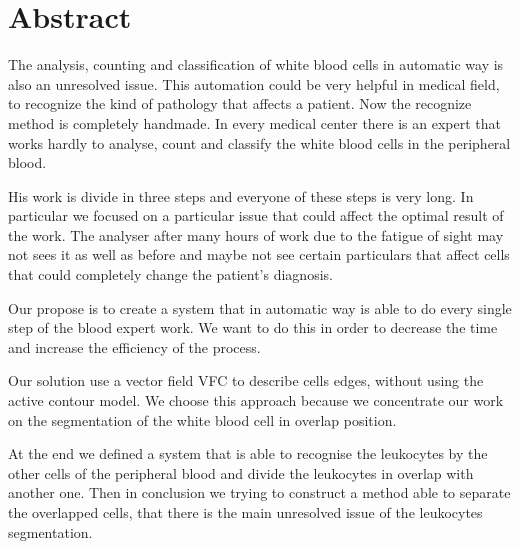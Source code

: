 \chapter*{Abstract}

The analysis, counting and classification of white blood cells in automatic way is also an unresolved issue. This automation could be very helpful in medical field, to recognize the kind of pathology that affects a patient. Now the recognize method is completely handmade. In every medical center there is an expert that works hardly to analyse, count and classify the white blood cells in the peripheral blood.

\bigskip

His work is divide in three steps and everyone of these steps is very long. In particular we focused on a particular issue that could affect the optimal result of the work. The analyser after many hours of work due to the fatigue of sight may not sees it as well as before and maybe not see certain particulars that affect cells that could completely change the patient's diagnosis.

\bigskip

Our propose is to create a system that in automatic way is able to do every single step of the blood expert work. We want to do this in order to decrease the time and increase the efficiency of the process.

\bigskip

Our solution use a vector field VFC to describe cells edges, without using the active contour model. We choose this approach because we concentrate our work on the segmentation of the white blood cell in overlap position.

\bigskip

At the end we defined a system that is able to recognise the leukocytes by the other cells of the peripheral blood and divide the leukocytes in overlap with another one. Then in conclusion we trying to construct a method able to separate the overlapped cells, that there is the main unresolved issue of the leukocytes segmentation.


